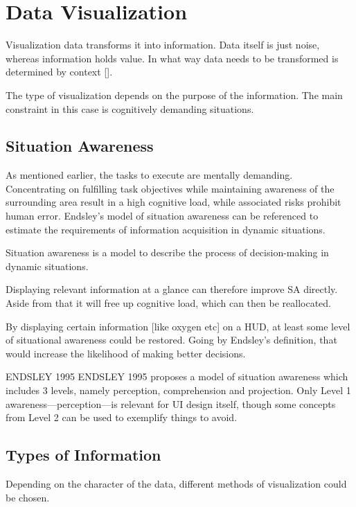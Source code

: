 \section{Data Visualization}
\label{sec:datavis}

Visualization data transforms it into information. Data itself is just noise, whereas information holds value. In what way data needs to be transformed is determined by context [\cite{terganKnowledgeInformationVisualization2005}].

The type of visualization depends on the purpose of the information. The main constraint in this case is cognitively demanding situations.

\subsection{Situation Awareness}

As mentioned earlier, the tasks to execute are mentally demanding. Concentrating on fulfilling task objectives while maintaining awareness of the surrounding area result in a high cognitive load, while associated risks prohibit human error. Endsley's model of situation awareness can be referenced to estimate the requirements of information acquisition in dynamic situations.

Situation awareness is a model to describe the process of decision-making in dynamic situations.

Displaying relevant information at a glance can therefore improve SA directly. Aside from that it will free up cognitive load, which can then be reallocated.

By displaying certain information [like oxygen etc] on a HUD, at least some level of situational awareness could be restored. Going by Endsley's definition, that would increase the likelihood of making better decisions.

ENDSLEY 1995
ENDSLEY 1995 proposes a model of situation awareness which includes 3 levels, namely perception, comprehension and projection. Only Level 1 awareness—perception—is relevant for UI design itself, though some concepts from Level 2 can be used to exemplify things to avoid.

\subsection{Types of Information}

Depending on the character of the data, different methods of visualization could be chosen.

